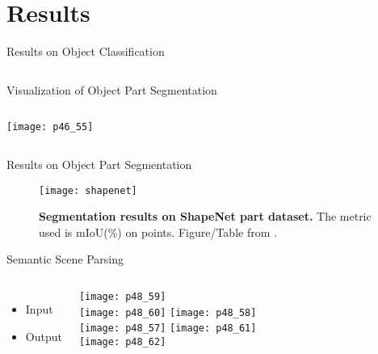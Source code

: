 \section{Results}
\begin{frame}[c]{Results on Object Classification}
    \begin{columns}
        \centering
        
    \end{columns}
\end{frame}


\begin{frame}[c]{Visualization of Object Part Segmentation}
    \begin{columns}
        \texttt{[image: p46\_55]}
    \end{columns}
\end{frame}


\begin{frame}[c]{Results on Object Part Segmentation}
    \begin{figure}
        \texttt{[image: shapenet]}
        \caption{
            \textbf{Segmentation results on ShapeNet part dataset.} The metric
            used is mIoU(\%) on points. Figure/Table from \cite{qi2017pointnet}.}
    \end{figure}
\end{frame}

\begin{frame}[c]{Semantic Scene Parsing}
    \Large
    \begin{columns}
        \begin{itemize}
            \item Input
                \vspace{3em}
            \item Output
        \end{itemize}
        \texttt{[image: p48\_59]} \\
        \texttt{[image: p48\_60]}
        \texttt{[image: p48\_58]} \\
        \texttt{[image: p48\_57]}
        \texttt{[image: p48\_61]} \\
        \texttt{[image: p48\_62]}
    \end{columns}
\end{frame}


